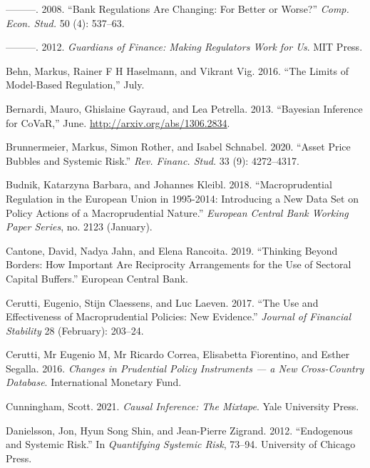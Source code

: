 \documentclass[
  10pt,
]{article}
\begin{document}
\leavevmode\hypertarget{ref-Barth2008}{}%
---------. 2008. ``Bank Regulations Are Changing: For Better or Worse?''
\emph{Comp. Econ. Stud.} 50 (4): 537--63.

\leavevmode\hypertarget{ref-Barth2012}{}%
---------. 2012. \emph{Guardians of Finance: Making Regulators Work for
Us}. MIT Press.

\leavevmode\hypertarget{ref-Behn2016}{}%
Behn, Markus, Rainer F H Haselmann, and Vikrant Vig. 2016. ``The Limits
of Model-Based Regulation,'' July.

\leavevmode\hypertarget{ref-Bernardi2013}{}%
Bernardi, Mauro, Ghislaine Gayraud, and Lea Petrella. 2013. ``Bayesian
Inference for CoVaR,'' June. \url{http://arxiv.org/abs/1306.2834}.

\leavevmode\hypertarget{ref-Brunnermeier2020}{}%
Brunnermeier, Markus, Simon Rother, and Isabel Schnabel. 2020. ``Asset
Price Bubbles and Systemic Risk.'' \emph{Rev. Financ. Stud.} 33 (9):
4272--4317.

\leavevmode\hypertarget{ref-Budnik2018}{}%
Budnik, Katarzyna Barbara, and Johannes Kleibl. 2018. ``Macroprudential
Regulation in the European Union in 1995-2014: Introducing a New Data
Set on Policy Actions of a Macroprudential Nature.'' \emph{European
Central Bank Working Paper Series}, no. 2123 (January).

\leavevmode\hypertarget{ref-Cantone2019}{}%
Cantone, David, Nadya Jahn, and Elena Rancoita. 2019. ``Thinking Beyond
Borders: How Important Are Reciprocity Arrangements for the Use of
Sectoral Capital Buffers.'' European Central Bank.

\leavevmode\hypertarget{ref-Cerutti2017}{}%
Cerutti, Eugenio, Stijn Claessens, and Luc Laeven. 2017. ``The Use and
Effectiveness of Macroprudential Policies: New Evidence.'' \emph{Journal
of Financial Stability} 28 (February): 203--24.

\leavevmode\hypertarget{ref-Cerutti2016}{}%
Cerutti, Mr Eugenio M, Mr Ricardo Correa, Elisabetta Fiorentino, and
Esther Segalla. 2016. \emph{Changes in Prudential Policy Instruments ---
a New Cross-Country Database}. International Monetary Fund.

\leavevmode\hypertarget{ref-Cunningham2021}{}%
Cunningham, Scott. 2021. \emph{Causal Inference: The Mixtape}. Yale
University Press.

\leavevmode\hypertarget{ref-Danielsson2012}{}%
Danielsson, Jon, Hyun Song Shin, and Jean-Pierre Zigrand. 2012.
``Endogenous and Systemic Risk.'' In \emph{Quantifying Systemic Risk},
73--94. University of Chicago Press.
\end{document}
